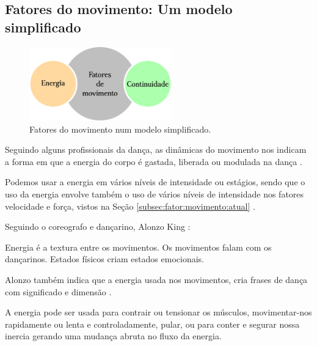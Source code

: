 \subsection{Fatores do movimento: Um modelo simplificado}

\begin{figure}
\centering

\includegraphics[width=0.55\textwidth]{chapters/cap-musicalidade/fatores-de-movimento.eps}
\caption{Fatores do movimento num modelo simplificado.}
\label{fig:fatores:moviemnto:simplificada}
\end{figure}
Seguindo alguns profissionais  da dança, 
as dinâmicas do movimento nos indicam a forma em que a energia do corpo
é gastada, liberada ou modulada na dança \cite[pp. 126, 131, 136]{mccutchen2006teaching}.

Podemos usar a energia em vários níveis de intensidade ou estágios,
sendo que o uso da energia envolve também o uso de vários níveis de intensidade 
nos fatores velocidade e força, vistos na Seção  \ref{subsec:fator:movimento:atual} \cite[pp. 99]{sofras2019dance}.

Seguindo o coreografo e dançarino, Alonzo King \cite[pp. 99, 100]{sofras2019dance}:
\begin{citando}%
Energia é a textura entre os movimentos.
Os movimentos falam com os dançarinos.
Estados físicos criam estados emocionais.
\end{citando}
Alonzo também indica que a energia usada nos movimentos,
 cria frases de dança com significado e dimensão \cite[pp. 99]{sofras2019dance}.

A energia pode ser usada para contrair ou tensionar os músculos,
movimentar-nos rapidamente ou lenta e controladamente, pular, 
ou para conter e segurar nossa inercia gerando uma mudança abruta no fluxo da energia.

